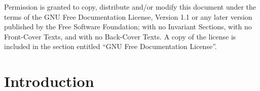 \documentclass[12pt,twoside,openright,a4paper]{book}
\begin{document}
Permission is granted to copy, distribute and/or modify this document under the terms of the GNU Free Documentation License, Version 1.1 or any later version published by the Free Software Foundation; with no Invariant Sections, with no Front-Cover Texts, and with no Back-Cover Texts. A copy of the license is included in the section entitled ``GNU Free Documentation License''.



\setcounter{page}{0}
\pagestyle{clean}

\setcounter{tocdepth}{1}
\dominitoc \tableofcontents

\noptcrule
\nomtcrule									%
\renewcommand{\mtcoffset}{-1.5em}			%
\def\mtcSfont{\normalsize}
\def\mtcSSfont{\small}



\mainmatter


\chapter{Introduction}

\end{document}
